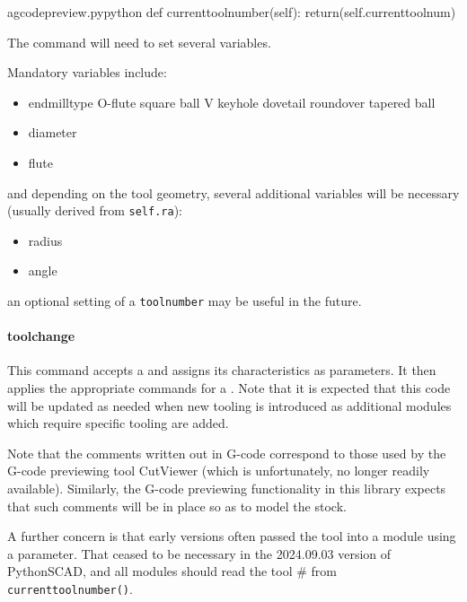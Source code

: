 \documentclass{ltxdoc}
\begin{document}
\lstset{firstnumber=\thegcpy}
\begin{writecode}{a}{gcodepreview.py}{python}
    def currenttoolnumber(self):
        return(self.currenttoolnum)

\end{writecode}
\addtocounter{gcpy}{3}

The  command will need to set several variables.

Mandatory variables include:

\begin{itemize}
\item endmilltype
\subitem O-flute
\subitem square
\subitem ball
\subitem V
\subitem keyhole
\subitem dovetail
\subitem roundover
\subitem tapered ball
\item diameter
\item flute
\end{itemize}

\noindent and depending on the tool geometry, several additional variables will be necessary (usually derived from \verb|self.ra|):

\begin{itemize}
\item radius
\item angle
\end{itemize}

\noindent an optional setting of a \verb|toolnumber| may be useful in the future.

\paragraph{toolchange}

This command accepts a  and assigns its characteristics as parameters. It then applies the appropriate commands for a \label{subsubsec:toolchange} . Note that it is expected that this code will be updated as needed when new tooling is introduced as additional modules which require specific tooling are added. 

Note that the comments written out in G-code correspond to those used by the G-code previewing tool CutViewer (which is unfortunately, no longer readily available). Similarly, the G-code previewing functionality in this library expects that such comments will be in place so as to model the stock.

A further concern is that early versions often passed the tool into a module using a parameter. That ceased to be necessary in the 2024.09.03 version of PythonSCAD, and all modules should read the tool \# from \verb|currenttoolnumber()|. %
\end{document}
